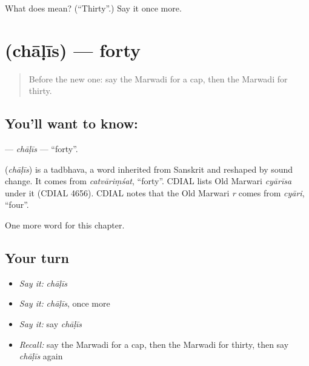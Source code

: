 \begin{tcolorbox}[breakable,colback=teal!4,colframe=teal!35!black,title={Before you move on}]
What does  mean? (\textquotedblleft{}Thirty\textquotedblright{}.) Say it once more.
\end{tcolorbox}
\section[\texorpdfstring{\mw{चाळीस} (chāḷīs)}{चाळीस (chāḷīs)}]{ (chāḷīs) — forty}

\label{lesson:MW-C86-chalis}



\begin{quote}
Before the new one: say the Marwadi for a cap, then the Marwadi for thirty.
\end{quote}

\subsection*{You'll want to know: }
\textbf{} — \emph{chāḷīs} — \textquotedblleft{}forty\textquotedblright{}.

\begin{cousinweb}
\textbf{} (\emph{chāḷīs}) is a tadbhava, a word inherited from Sanskrit and reshaped by sound change. It comes from \emph{catvāriṃśat}, \textquotedblleft{}forty\textquotedblright{}. CDIAL lists Old Marwari \emph{cyārīsa} under it (CDIAL 4656). CDIAL notes that the Old Marwari \emph{r} comes from \emph{cyāri}, \textquotedblleft{}four\textquotedblright{}.
\end{cousinweb}

\begin{grammarlens}[title={What you've built}]
One more word for this chapter.
\end{grammarlens}

\subsection*{Your turn}
\begin{itemize}
\raggedright
  \item \emph{Say it:} \emph{chāḷīs}
  \item \emph{Say it:} \emph{chāḷīs}, once more
  \item \emph{Say it:} say \emph{chāḷīs}
  \item \emph{Recall:} say the Marwadi for a cap, then the Marwadi for thirty, then say \emph{chāḷīs} again
\end{itemize}

